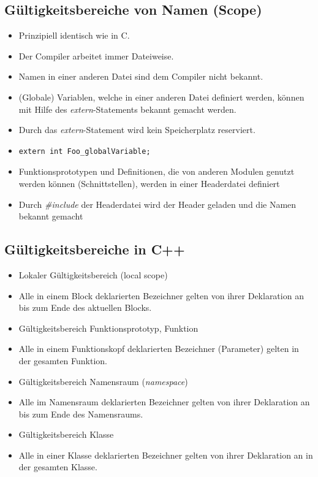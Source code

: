 \subsection{Gültigkeitsbereiche von Namen (Scope)}
\begin{itemize}
	\item Prinzipiell identisch wie in C.
	\item Der Compiler arbeitet immer Dateiweise.
	\item Namen in einer anderen Datei sind dem Compiler nicht bekannt.
	\item (Globale) Variablen, welche in einer anderen Datei definiert werden, können mit Hilfe des \emph{extern}-Statements bekannt gemacht werden.
	\item Durch das \emph{extern}-Statement wird kein Speicherplatz reserviert.
	\item[\-]
	\vspace{-\baselineskip}
\begin{minipage}{0.4\linewidth}
\begin{lstlisting}
extern int Foo_globalVariable;
\end{lstlisting}
\end{minipage}
	\item Funktionsprototypen und Definitionen, die von anderen Modulen genutzt werden können (Schnittstellen), werden in einer Headerdatei definiert
	\item Durch \emph{\#include} der Headerdatei wird der Header geladen und die Namen bekannt gemacht
\end{itemize}

\subsection{Gültigkeitsbereiche in C++}
\begin{itemize}
	\item Lokaler Gültigkeitsbereich (local scope)
	\item[\-] Alle in einem Block deklarierten Bezeichner gelten von ihrer Deklaration an bis zum Ende des aktuellen Blocks.
	\item Gültigkeitsbereich Funktionsprototyp, Funktion
	\item[\-] Alle in einem Funktionskopf deklarierten Bezeichner (Parameter) gelten in der gesamten Funktion.
	\item Gültigkeitsbereich Namensraum (\emph{namespace})
	\item[\-] Alle im Namensraum deklarierten Bezeichner gelten von ihrer Deklaration an bis zum Ende des Namensraums.
	\item Gültigkeitsbereich Klasse
	\item[\-] Alle in einer Klasse deklarierten Bezeichner gelten von ihrer Deklaration an in der gesamten Klasse.
\end{itemize}

